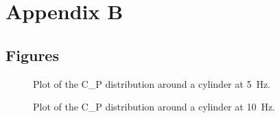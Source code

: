 \chapter{Appendix B}
\section{Figures}\label{ch:graphs}

\begin{figure}[htpb]
    \centering
    
    \caption[Plot of the \gls{C_P} distribution around a cylinder at \qty{5}{\hertz}.]{Plot of the \gls{C_P} distribution around a cylinder at \qty{5}{\hertz}.}
    \label{fig:c_p_distribution_5hz}
\end{figure}

\begin{figure}[htpb]
    \centering
    
    \caption[Plot of the \gls{C_P} distribution around a cylinder at \qty{10}{\hertz}.]{Plot of the \gls{C_P} distribution around a cylinder at \qty{10}{\hertz}.}
    \label{fig:c_p_distribution_10hz}
\end{figure}

